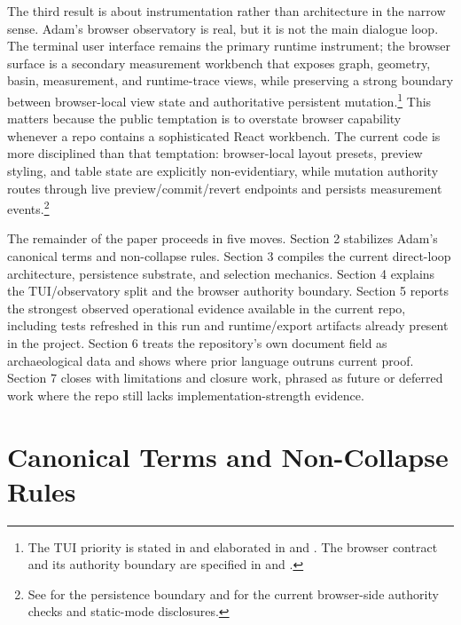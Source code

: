 \documentclass[10pt]{article}
\begin{document}
The third result is about instrumentation rather than architecture in the narrow sense. Adam's browser observatory is real, but it is not the main dialogue loop. The terminal user interface remains the primary runtime instrument; the browser surface is a secondary measurement workbench that exposes graph, geometry, basin, measurement, and runtime-trace views, while preserving a strong boundary between browser-local view state and authoritative persistent mutation.\footnote{The TUI priority is stated in  and elaborated in  and . The browser contract and its authority boundary are specified in  and .} This matters because the public temptation is to overstate browser capability whenever a repo contains a sophisticated React workbench. The current code is more disciplined than that temptation: browser-local layout presets, preview styling, and table state are explicitly non-evidentiary, while mutation authority routes through live preview/commit/revert endpoints and persists measurement events.\footnote{See  for the persistence boundary and  for the current browser-side authority checks and static-mode disclosures.}

The remainder of the paper proceeds in five moves. Section 2 stabilizes Adam's canonical terms and non-collapse rules. Section 3 compiles the current direct-loop architecture, persistence substrate, and selection mechanics. Section 4 explains the TUI/observatory split and the browser authority boundary. Section 5 reports the strongest observed operational evidence available in the current repo, including tests refreshed in this run and runtime/export artifacts already present in the project. Section 6 treats the repository's own document field as archaeological data and shows where prior language outruns current proof. Section 7 closes with limitations and closure work, phrased as future or deferred work where the repo still lacks implementation-strength evidence.

\section{Canonical Terms and Non-Collapse Rules}
\end{document}
